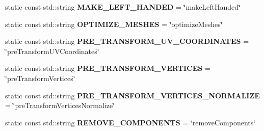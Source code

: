 \begin{DoxyCompactItemize}
\item 
\hypertarget{classrepo_1_1manipulator_1_1modelconvertor_1_1_model_import_config_aecbf71733abfeec8cf733cb9ea1dd6dd}{}static const std\+::string {\bfseries M\+A\+K\+E\+\_\+\+L\+E\+F\+T\+\_\+\+H\+A\+N\+D\+E\+D} = \char`\"{}make\+Left\+Handed\char`\"{}\label{classrepo_1_1manipulator_1_1modelconvertor_1_1_model_import_config_aecbf71733abfeec8cf733cb9ea1dd6dd}

\item 
\hypertarget{classrepo_1_1manipulator_1_1modelconvertor_1_1_model_import_config_a3540510fe29c173d6dec5263067a6786}{}static const std\+::string {\bfseries O\+P\+T\+I\+M\+I\+Z\+E\+\_\+\+M\+E\+S\+H\+E\+S} = \char`\"{}optimize\+Meshes\char`\"{}\label{classrepo_1_1manipulator_1_1modelconvertor_1_1_model_import_config_a3540510fe29c173d6dec5263067a6786}

\item 
\hypertarget{classrepo_1_1manipulator_1_1modelconvertor_1_1_model_import_config_af0b1960d45b341dfa3e335f89db1e534}{}static const std\+::string {\bfseries P\+R\+E\+\_\+\+T\+R\+A\+N\+S\+F\+O\+R\+M\+\_\+\+U\+V\+\_\+\+C\+O\+O\+R\+D\+I\+N\+A\+T\+E\+S} = \char`\"{}pre\+Transform\+U\+V\+Coordinates\char`\"{}\label{classrepo_1_1manipulator_1_1modelconvertor_1_1_model_import_config_af0b1960d45b341dfa3e335f89db1e534}

\item 
\hypertarget{classrepo_1_1manipulator_1_1modelconvertor_1_1_model_import_config_acf7b8e5200c436bb53d35a1e990f25f9}{}static const std\+::string {\bfseries P\+R\+E\+\_\+\+T\+R\+A\+N\+S\+F\+O\+R\+M\+\_\+\+V\+E\+R\+T\+I\+C\+E\+S} = \char`\"{}pre\+Transform\+Vertices\char`\"{}\label{classrepo_1_1manipulator_1_1modelconvertor_1_1_model_import_config_acf7b8e5200c436bb53d35a1e990f25f9}

\item 
\hypertarget{classrepo_1_1manipulator_1_1modelconvertor_1_1_model_import_config_a8a1b93cd1986276bf8e1c490df0f9efa}{}static const std\+::string {\bfseries P\+R\+E\+\_\+\+T\+R\+A\+N\+S\+F\+O\+R\+M\+\_\+\+V\+E\+R\+T\+I\+C\+E\+S\+\_\+\+N\+O\+R\+M\+A\+L\+I\+Z\+E} = \char`\"{}pre\+Transform\+Vertices\+Normalize\char`\"{}\label{classrepo_1_1manipulator_1_1modelconvertor_1_1_model_import_config_a8a1b93cd1986276bf8e1c490df0f9efa}

\item 
\hypertarget{classrepo_1_1manipulator_1_1modelconvertor_1_1_model_import_config_a7cf9984c799cea2cceb74b17f46570d7}{}static const std\+::string {\bfseries R\+E\+M\+O\+V\+E\+\_\+\+C\+O\+M\+P\+O\+N\+E\+N\+T\+S} = \char`\"{}remove\+Components\char`\"{}\label{classrepo_1_1manipulator_1_1modelconvertor_1_1_model_import_config_a7cf9984c799cea2cceb74b17f46570d7}


\end{DoxyCompactItemize}
